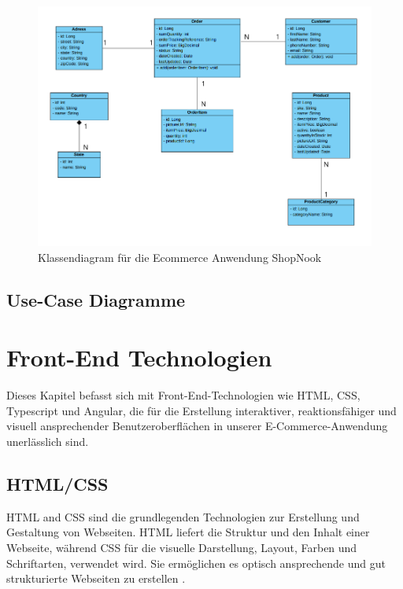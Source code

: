 \begin{figure}[h]
	\centering
	\includegraphics[width=\textwidth]{images/ClassDiagram.png}
	\caption{Klassendiagram für die Ecommerce Anwendung ShopNook}
	\label{fig:class_diagram}
\end{figure}

\subsection{Use-Case Diagramme}


\section{Front-End Technologien}

Dieses Kapitel befasst sich mit Front-End-Technologien wie HTML, CSS, Typescript und Angular, die für die Erstellung interaktiver, reaktionsfähiger und visuell ansprechender Benutzeroberflächen in unserer E-Commerce-Anwendung unerlässlich sind.

\subsection{HTML/CSS}

HTML and CSS sind die grundlegenden Technologien zur Erstellung und Gestaltung von Webseiten. HTML liefert die Struktur und den Inhalt einer Webseite, während CSS für die visuelle Darstellung, Layout, Farben und Schriftarten, verwendet wird. Sie ermöglichen es optisch ansprechende und gut strukturierte Webseiten zu erstellen \cite{HTML/CSS:2024}.


